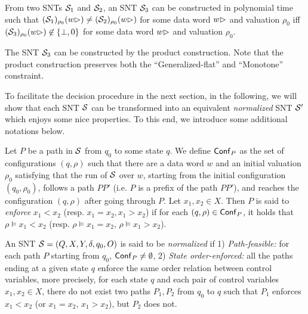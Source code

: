 \begin{proposition}\label{prop-snt-eqv-to-nzero}
From two SNTs ${\mathcal{S} }_1$ and ${\mathcal{S} }_2$, an SNT ${\mathcal{S} }_3$ can be constructed in polynomial time such that  $({\mathcal{S} }_1)_{\rho_0}(w\rhd) \neq ({\mathcal{S} }_2)_{\rho_0}(w\rhd)$ for some  data word $w \rhd$ and valuation $\rho_0$  iff $({\mathcal{S} }_3)_{\rho_0}(w\rhd) \not\in \{\bot,0\}$ for some data word $w\rhd$ and valuation $\rho_0$.
\end{proposition}
The SNT ${\mathcal{S} }_3$ can be constructed by the product construction. Note that the product construction preserves both the ``Generalized-flat'' and ``Monotone'' constraint. 

To facilitate the decision procedure in the next section, in the following, we will show that each SNT ${\mathcal{S} }$ can be transformed into an equivalent \emph{normalized} SNT ${\mathcal{S} }'$ which enjoys some nice properties. To this end, we introduce some additional notations below.


Let $P$ be a path in ${\mathcal{S} }$ from $q_0$ to some state $q$. We define ${\sf Conf}_P$ as the set of configurations $(q, \rho)$ such that there are a data word $w$ and an initial valuation $\rho_0$ satisfying that the run of ${\mathcal{S} }$ over $w$, starting from the initial configuration $(q_0, \rho_0)$, follows a path $P P'$ (i.e. $P$ is a prefix of the path $PP'$), and reaches the configuration $(q,\rho)$ after going through $P$. Let $x_1, x_2 \in X$. Then $P$ is said to \emph{enforce} $x_1 < x_2$ (resp. $x_1 = x_2, x_1 > x_2$) if for each $(q,\rho) \in {\sf Conf}_P$, it holds that $\rho \models x_1 < x_2$ (resp. $\rho \models x_1 = x_2$, $\rho \models x_1 > x_2$). 

An SNT ${\mathcal{S} }=(Q, X, Y, \delta, q_0, O)$ is said to be \emph{normalized} if 1) {\it Path-feasible:} for each path $P$ starting from $q_0$, ${\sf Conf}_P \neq \emptyset$, 2) {\it State order-enforced:} all the paths ending at a given state $q$ enforce the same order relation between control variables, more precisely, for each state $q$ and each pair of control variables $x_1, x_2 \in X$, there do not exist two paths $P_1, P_2$ from $q_0$ to $q$ such that $P_1$ enforces $x_1 < x_2$ (or $x_1 = x_2$, $x_1 > x_2$), but $P_2$ does not.
%
%
%
%

